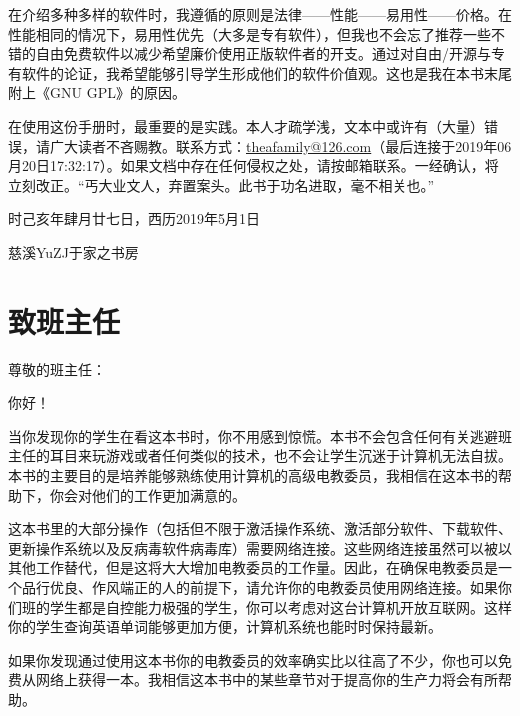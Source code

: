 在介绍多种多样的软件时，我遵循的原则是法律——性能——易用性——价格。在性能相同的情况下，易用性优先（大多是专有软件），但我也不会忘了推荐一些不错的自由免费软件以减少希望廉价使用正版软件者的开支。通过对自由/开源与专有软件的论证，我希望能够引导学生形成他们的软件价值观。这也是我在本书末尾附上《GNU GPL》的原因。\par
 在使用这份手册时，最重要的是实践。本人才疏学浅，文本中或许有（大量）错误，请广大读者不吝赐教。联系方式：\url{theafamily@126.com}（最后连接于2019年06月20日17:32:17）。如果文档中存在任何侵权之处，请按邮箱联系。一经确认，将立刻改正。“丐大业文人，弃置案头。此书于功名进取，毫不相关也。”\par
时己亥年肆月廿七日，西历2019年5月1日\par
慈溪YuZJ于家之书房
\section{致班主任}
\noindent 尊敬的班主任：\par
你好！\par
当你发现你的学生在看这本书时，你不用感到惊慌。本书不会包含任何有关逃避班主任的耳目来玩游戏或者任何类似的技术，也不会让学生沉迷于计算机无法自拔。本书的主要目的是培养能够熟练使用计算机的高级电教委员，我相信在这本书的帮助下，你会对他们的工作更加满意的。\par
这本书里的大部分操作（包括但不限于激活操作系统、激活部分软件、下载软件、更新操作系统以及反病毒软件病毒库）需要网络连接。这些网络连接虽然可以被以其他工作替代，但是这将大大增加电教委员的工作量。因此，在确保电教委员是一个品行优良、作风端正的人的前提下，请允许你的电教委员使用网络连接。如果你们班的学生都是自控能力极强的学生，你可以考虑对这台计算机开放互联网。这样你的学生查询英语单词能够更加方便，计算机系统也能时时保持最新。\par
如果你发现通过使用这本书你的电教委员的效率确实比以往高了不少，你也可以免费从网络上获得一本。我相信这本书中的某些章节对于提高你的生产力将会有所帮助。
